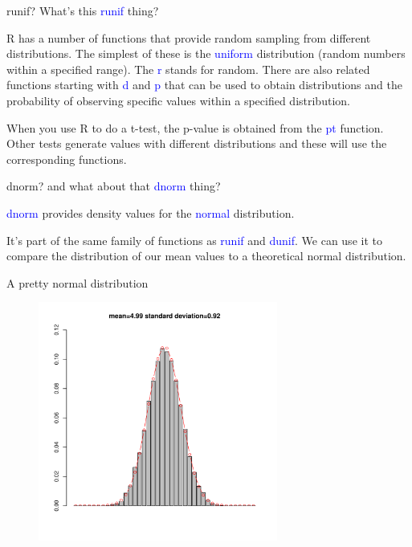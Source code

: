\documentclass[pdf]{beamer}
\begin{document}
\begin{frame}{runif?}
  What's this \textcolor{blue}{runif} thing?

  R has a number of functions that provide random sampling from
  different distributions. The simplest of these is the \textcolor{blue}{uniform}
  distribution (random numbers within a specified range). The \textcolor{blue}{r}
  stands for random. There are also related functions starting with
  \textcolor{blue}{d} and \textcolor{blue}{p} that can be used to obtain
  distributions and the probability of observing specific values within a specified
  distribution.

  When you use R to do a t-test, the p-value is obtained from the \textcolor{blue}{pt}
  function. Other tests generate values with different distributions and
  these will use the corresponding functions.
\end{frame}

\begin{frame}{dnorm?}
  and what about that \textcolor{blue}{dnorm} thing?

  \textcolor{blue}{dnorm} provides density values for the
  \textcolor{blue}{normal} distribution. 

  It's part of the same family of functions as \textcolor{blue}{runif}
  and \textcolor{blue}{dunif}. We can use it to compare the distribution
  of our mean values to a theoretical normal distribution.
\end{frame}

\begin{frame}{A pretty normal distribution}
  \begin{figure}[ht]
    \includegraphics[width=0.7\textwidth]{images/dist2}
  \end{figure}
\end{frame}
\end{document}
